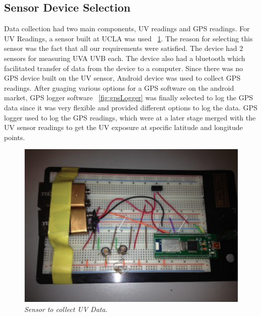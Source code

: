 \documentclass[10pt]{sigplan-proc-varsize}
\begin{document}
\subsection{Sensor Device Selection}
Data collection had two main components, UV readings and GPS readings. For UV Readings, a sensor built at UCLA was used ~\ref{fig:uvSensor}. The reason for selecting this sensor was the fact that all our requirements were satisfied. The device had 2 sensors for measuring UVA  UVB each. The device also had a bluetooth which facilitated transfer of data from the device to a computer. Since there was no GPS device built on the UV sensor, Android device was used to collect GPS readings. After guaging various options for a GPS software on the android market, GPS logger software ~\ref{fig:gpsLogger} was finally selected to log the GPS data since it was very flexible and provided different options to log the data. GPS logger used to log the GPS readings, which were at a later stage merged with the UV sensor readings to get the UV exposure at specific latitude and longitude points. 
\begin{figure}
\begin{center}
\includegraphics[scale=0.45]{uvSensor.png}
\caption{\small \sl Sensor to collect UV Data.\label{fig:uvSensor}}
\end{center}
\end{figure}
\end{document}

